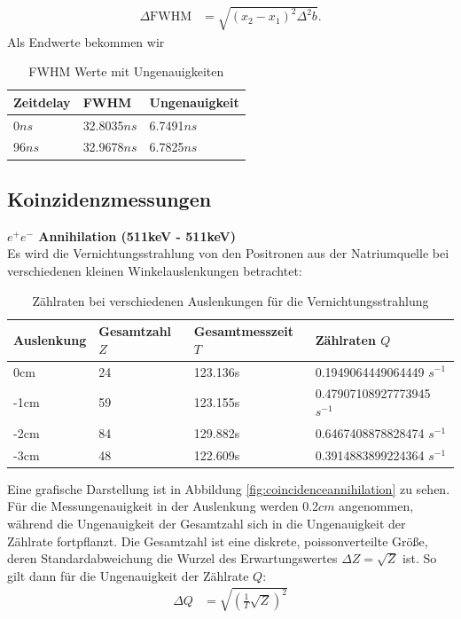\documentclass[%
aps,
onecolumn,
11pt,
tightenlines,
nofootinbib,
superscriptaddress,
floatfix,
prd,
]{revtex4-2}
\begin{document}
\begin{align}
	\Delta \text{FWHM} &= \sqrt{ (x_2 - x_1)^2\Delta^2 b }.
\end{align}
Als Endwerte bekommen wir
\begin{table}[H]
	\centering
	\begin{tabular}{lll}
		\toprule
			Zeitdelay & FWHM         & Ungenauigkeit \\
		\midrule
			0$ns$     & 32.8035$ns$ & 6.7491$ns$ \\
		\cline{1-3}
			96$ns$    & 32.9678$ns$ & 6.7825$ns$ \\
		\cline{1-3}
		\bottomrule
	\end{tabular}
	\caption{FWHM Werte mit Ungenauigkeiten}
	\label{tab:fwhm}
\end{table}

\newpage
\subsection{Koinzidenzmessungen}
\noindent \textbf{$e^+e^-$ Annihilation (511keV - 511keV)}\\
	Es wird die Vernichtungsstrahlung von den Positronen aus der Natriumquelle bei verschiedenen kleinen Winkelauslenkungen betrachtet:

\begin{table}[H]
    \centering
    \begin{tabular}{llll}
    \hline
        Auslenkung & Gesamtzahl $Z$ & Gesamtmesszeit $T$ & Zählraten $Q$\\ \hline
        0cm & 24 & 123.136s & 0.1949064449064449 $s^{-1}$ \\ \hline
        -1cm & 59 & 123.155s & 0.47907108927773945 $s^{-1}$ \\ \hline
        -2cm & 84 & 129.882s & 0.6467408878828474 $s^{-1}$ \\ \hline
        -3cm & 48 & 122.609s & 0.3914883899224364 $s^{-1}$ \\ \hline
    \end{tabular}
	\caption{Zählraten bei verschiedenen Auslenkungen für die Vernichtungsstrahlung}
	\label{tab:coincidenceannihilation}
\end{table}

Eine grafische Darstellung ist in Abbildung \ref{fig:coincidenceannihilation} zu sehen. Für die Messungenauigkeit in der Auslenkung werden 0.2$cm$ angenommen, während die Ungenauigkeit der Gesamtzahl sich in die Ungenauigkeit der Zählrate fortpflanzt. Die Gesamtzahl ist eine diskrete, poissonverteilte Größe, deren Standardabweichung die Wurzel des Erwartungswertes $\Delta Z = \sqrt{Z}$ ist. So gilt dann für die Ungenauigkeit der Zählrate $Q$:
\begin{align}
	\Delta Q &= \sqrt{ \left( \frac{1}{T}\sqrt{Z}  \right)^2  }
\end{align}
\end{document}
